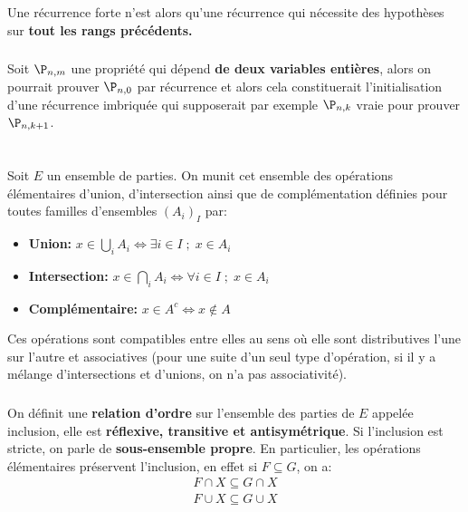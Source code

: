 Une récurrence forte n'est alors qu'une récurrence qui nécessite des hypothèses sur \textbf{tout les rangs précédents.}
   
\subsection*{}

Soit \(\P_{n,m}\) une propriété qui dépend \textbf{de deux variables entières}, alors on pourrait prouver \(\P_{n, 0}\) par récurrence et alors cela constituerait l'initialisation d'une récurrence imbriquée qui supposerait par exemple \(\P_{n, k}\) vraie pour prouver \(\P_{n, k+1}\).
\chapter*{}

Soit \(E\) un ensemble de parties. On munit cet ensemble des opérations élémentaires d'union, d'intersection ainsi que de complémentation définies pour toutes familles d'ensembles \( (A_i)_I \) par:
\begin{itemize}
    \item \textbf{Union:} \(x \in \bigcup_i A_i \iff \exists i \in I \; ; \; x \in A_i\)
    \item \textbf{Intersection:} \(x \in \bigcap_i A_i \iff \forall i \in I \; ; \; x \in A_i\)
    \item \textbf{Complémentaire:} \(x \in A^c \iff x \not \in A\)
\end{itemize}
Ces opérations sont compatibles entre elles au sens où elle sont distributives l'une sur l'autre et associatives (pour une suite d'un seul type d'opération, si il y a mélange d'intersections et d'unions, on n'a pas associativité).
\subsection*{}

On définit une \textbf{relation d'ordre} sur l'ensemble des parties de \(E\) appelée inclusion, elle est \textbf{réflexive, transitive et antisymétrique}. Si l'inclusion est stricte, on parle de \textbf{sous-ensemble propre}. En particulier, les opérations élémentaires préservent l'inclusion, en effet si \( F \subseteq G \), on a:
\begin{align*}
    F \cap X \subseteq G \cap X \\
    F \cup X \subseteq G \cup X
\end{align*}

